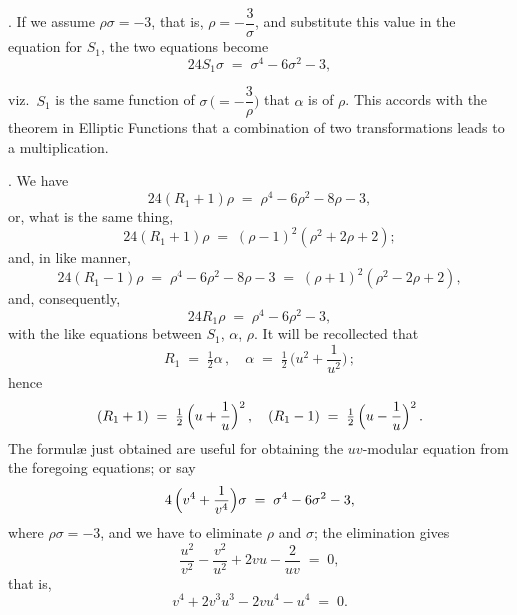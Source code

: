 \documentclass[11pt]{article}
\begin{document}
\begin{center}
\end{center}

\medskip

. If we assume $\rho\sigma = -3$, that is, $\rho = -\dfrac{3}{\sigma}$, and substitute this value in the equation for $S_1$, the two equations become
\[
24 S_1\sigma \;=\; \sigma^4 - 6\sigma^2 - 3,
\]

\newpage

\noindent viz.\ $S_1$ is the same function of $\sigma\,\bigl(=-\dfrac{3}{\rho}\bigr)$ that $\alpha$ is of $\rho$. This accords with the theorem in Elliptic Functions that a combination of two transformations leads to a multiplication.

\medskip

. We have
\[
24(R_1 + 1)\rho \;=\; \rho^4 - 6\rho^2 - 8\rho - 3,
\]
or, what is the same thing,
\[
24(R_1 + 1)\rho \;=\; (\rho - 1)^2(\rho^2 + 2\rho + 2);
\]
and, in like manner,
\[
24(R_1 - 1)\rho \;=\; \rho^4 - 6\rho^2 - 8\rho - 3 \;=\; (\rho + 1)^2(\rho^2 - 2\rho + 2),
\]
and, consequently,
\[
24 R_1\rho \;=\; \rho^4 - 6\rho^2 - 3,
\]
with the like equations between $S_1$, $\alpha$, $\rho$. It will be recollected that
\[
R_1 \;=\; \tfrac{1}{2}\alpha\,,\quad \alpha \;=\; \tfrac{1}{2}\,\bigl(u^2 + \dfrac{1}{u^2}\bigr)\,;
\]
hence
\[
(R_1 + 1) \;=\; \tfrac{1}{2}\,\Bigl(u + \dfrac{1}{u}\Bigr)^2\,,\quad (R_1 - 1) \;=\; \tfrac{1}{2}\,\Bigl(u - \dfrac{1}{u}\Bigr)^2\,.
\]
The formul\ae{} just obtained are useful for obtaining the $u v$-modular equation from the foregoing equations; or say
\[
4\,\Bigl(v^4 + \frac{1}{v^4}\Bigr)\sigma \;=\; \sigma^4 - 6\sigma^2 - 3,
\]
where $\rho\sigma = -3$, and we have to eliminate $\rho$ and $\sigma$; the elimination gives
\[
\frac{u^2}{v^2} - \frac{v^2}{u^2} + 2 v u - \frac{2}{u v} \;=\; 0,
\]
that is,
\[
v^4 + 2 v^3 u^3 - 2 v u^4 - u^4 \;=\; 0.
\]
\end{document}
